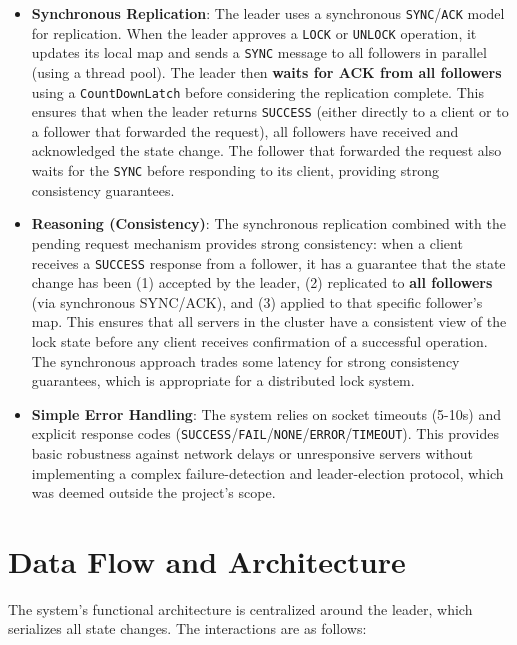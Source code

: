 \documentclass[a4paper,11pt]{article}
\begin{document}
\begin{itemize}
    \item \textbf{Synchronous Replication}: The leader uses a synchronous \texttt{SYNC}/\texttt{ACK} model for replication. When the leader approves a \texttt{LOCK} or \texttt{UNLOCK} operation, it updates its local map and sends a \texttt{SYNC} message to all followers in parallel (using a thread pool). The leader then \textbf{waits for ACK from all followers} using a \texttt{CountDownLatch} before considering the replication complete. This ensures that when the leader returns \texttt{SUCCESS} (either directly to a client or to a follower that forwarded the request), all followers have received and acknowledged the state change. The follower that forwarded the request also waits for the \texttt{SYNC} before responding to its client, providing strong consistency guarantees.
    
    \item \textbf{Reasoning (Consistency)}: The synchronous replication combined with the pending request mechanism provides strong consistency: when a client receives a \texttt{SUCCESS} response from a follower, it has a guarantee that the state change has been (1) accepted by the leader, (2) replicated to \textbf{all followers} (via synchronous SYNC/ACK), and (3) applied to that specific follower's map. This ensures that all servers in the cluster have a consistent view of the lock state before any client receives confirmation of a successful operation. The synchronous approach trades some latency for strong consistency guarantees, which is appropriate for a distributed lock system.

    \item \textbf{Simple Error Handling}: The system relies on socket timeouts (5-10s) and explicit response codes (\texttt{SUCCESS}/\texttt{FAIL}/\texttt{NONE}/\texttt{ERROR}/\texttt{TIMEOUT}). This provides basic robustness against network delays or unresponsive servers without implementing a complex failure-detection and leader-election protocol, which was deemed outside the project's scope.
\end{itemize}

\section{Data Flow and Architecture}
The system's functional architecture is centralized around the leader, which serializes all state changes. The interactions are as follows:
\end{document}
